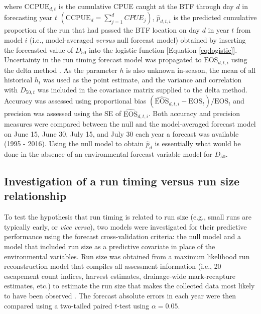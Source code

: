 \documentclass[12pt,]{book}
\theoremstyle{definition}
\theoremstyle{definition}
\theoremstyle{definition}
\theoremstyle{remark}
\begin{document}
\noindent
where \(\text{CCPUE}_{d,t}\) is the cumulative CPUE caught at the BTF
through day \(d\) in forecasting year \(t\)
\(\left(\text{CCPUE}_d = \sum_{j=1}^{d} CPUE_j \right)\),
\(\hat{p}_{d,t,i}\) is the predicted cumulative proportion of the run
that had passed the BTF location on day \(d\) in year \(t\) from model
\(i\) (i.e., model-averaged \emph{versus} null forecast model) obtained
by inserting the forecasted value of \(D_{50}\) into the logistic
function {[}Equation \eqref{eq:logistic}{]}. Uncertainty in the run timing
forecast model was propagated to \(\text{EOS}_{d,t,i}\) using the delta
method \citep{bolker-2008}. As the parameter \(h\) is also unknown
in-season, the mean of all historical \(h_t\) was used as the point
estimate, and the variance and correlation with \(D_{50,t}\) was
included in the covariance matrix supplied to the delta method. Accuracy
was assessed using proportional bias
\(\left(\widehat{\text{EOS}}_{d,t,i} - \text{EOS}_t\right)/\text{EOS}_t\)
and precision was assessed using the SE of
\(\widehat{\text{EOS}}_{d,t,i}\). Both accuracy and precision measures
were compared between the null and the model-averaged forecast model on
June 15, June 30, July 15, and July 30 each year a forecast was
available (1995 - 2016). Using the null model to obtain \(\hat{p}_d\) is
essentially what would be done in the absence of an environmental
forecast variable model for \(D_{50}\).

\subsection{Investigation of a run timing versus run size
relationship}\label{investigation-of-a-run-timing-versus-run-size-relationship}

\noindent
To test the hypothesis that run timing is related to run size (e.g.,
small runs are typically early, or \emph{vice versa}), two models were
investigated for their predictive performance using the forecast
cross-validation criteria: the null model and a model that included run
size as a predictive covariate in place of the environmental variables.
Run size was obtained from a maximum likelihood run reconstruction model
that compiles all assessment information (i.e., 20 escapement count
indices, harvest estimates, drainage-wide mark-recapture estimates,
etc.) to estimate the run size that makes the collected data most likely
to have been observed \citep{bue-etal-2012}. The forecast absolute
errors in each year were then compared using a two-tailed paired
\(t\)-test using \(\alpha = 0.05\).
\end{document}
